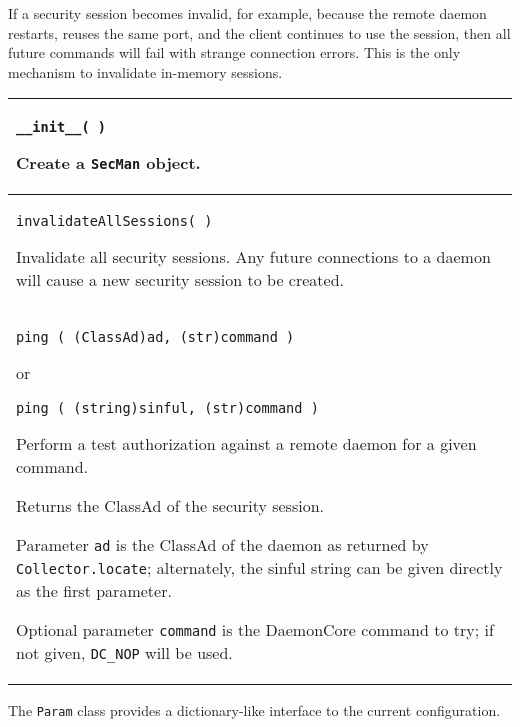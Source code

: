 If a security session becomes invalid,
for example, because the remote daemon restarts, reuses the same port, 
and the client continues to use the session,
then all future commands will fail with strange connection errors.
This is the only mechanism to invalidate in-memory sessions.

\begin{flushleft}
\begin{longtable}{|p{16cm}|} \hline

\texttt{\_\_init\_\_( )}

Create a \texttt{SecMan} object.
\\ \hline
\texttt{invalidateAllSessions( )}

Invalidate all security sessions.
Any future connections to a daemon will cause a new security session 
to be created.

\\ \hline
\texttt{ping ( (ClassAd)ad, (str)command )}

or

\texttt{ping ( (string)sinful, (str)command )}

Perform a test authorization against a remote daemon for a given
command.

Returns the ClassAd of the security session.

Parameter \texttt{ad} is the ClassAd of the daemon as returned by
\texttt{Collector.locate}; alternately, the sinful string can be given
directly as the first parameter.

Optional parameter \texttt{command} is the DaemonCore command to
try; if not given, \texttt{DC\_NOP} will be used.

\\ \hline

\end{longtable}
\end{flushleft}

The \texttt{Param} class provides a dictionary-like interface
to the current configuration.

